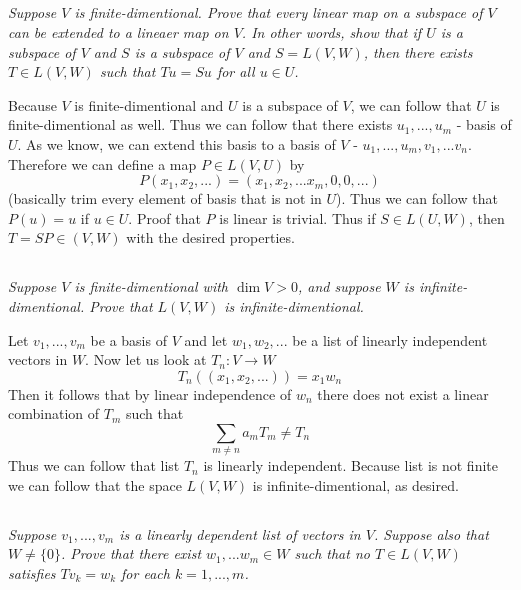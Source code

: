 \documentclass[11pt,oneside,titlepage]{book}
\begin{document}
\subsection{}
\textit{Suppose $V$ is finite-dimentional. Prove that every linear map on a subspace of $V$
  can be extended to a lineaer map on $V$. In other words, show that if $U$ is a subspace of $V$
  and $S$ is a subspace of $V$ and $S = L(V, W)$, then there exists $T \in L(V, W)$ such that
  $Tu = Su$ for all $u \in U$.}

Because $V$ is finite-dimentional and $U$ is a subspace of $V$, we can follow that $U$
is finite-dimentional as well. Thus we can follow that there exists
$u_1, ..., u_m$ - basis of $U$. As we know, we can extend this basis to a basis of $V$ -
$u_1, ..., u_m, v_1, ... v_n$. Therefore we can define a map $P \in L(V, U)$ by 
$$P(x_1, x_2, ...) = (x_1, x_2, ... x_m, 0, 0, ...)$$
(basically trim every element of basis that is not in $U$). Thus we can follow that
$P(u) = u$ if $u \in U$. Proof that $P$ is linear is trivial.
Thus if $S \in L(U, W)$, then $T = SP \in (V, W)$ with the
desired properties.

\subsection{}

\textit{Suppose $V$ is finite-dimentional with $\dim V > 0$, and suppose $W$ is
  infinite-dimentional. Prove that $L(V, W)$ is infinite-dimentional.}

Let $v_1, ..., v_m$ be a basis of $V$ and
let $w_1, w_2, ...$ be a list of linearly independent vectors in $W$. Now
let us look at $T_n: V \to W$
$$T_n((x_1, x_2, ...) ) = x_1 w_n$$
Then it follows that by linear independence of $w_n$ there does not exist a linear
combination of $T_m$ such that
$$\sum_{m \neq n} a_m T_m \neq T_n$$
Thus we can follow that list $T_n$ is linearly independent.
Because list is not finite we can follow that the space $L(V, W)$ is infinite-dimentional,
as desired.

\subsection{}

\textit{Suppose $v_1, ..., v_m$ is a linearly dependent list of vectors in $V$. Suppose
  also that $W \neq \{0\}$. Prove that there exist $w_1, ... w_m \in W$ such that no
  $T \in L(V, W)$ satisfies $Tv_k = w_k$ for each $k = 1, ..., m$.}
\end{document}
